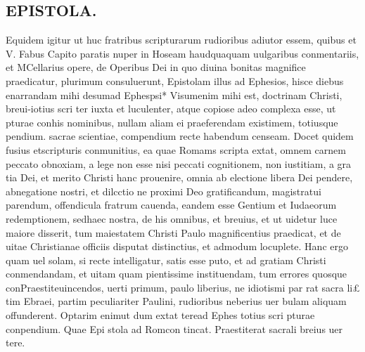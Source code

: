 \documentclass{article}
\begin{document}
\begin{pages}
\section*{EPISTOLA. }\pstart Equidem igitur ut huc fratribus scripturarum rudioribus   adiutor essem, quibus et V. Fabus  Capito paratis nuper in Hoseam haudquaquam uulgaribus conmentariis, et MCellarius opere, de Operibus Dei in quo diuina bonitas magnifice praedicatur, plurimum consuluerunt, Epistolam illus ad Ephesios, hisce diebus enarrandam mihi desumad Ephespsi* Visumenim mihi est, doctrinam Christi, breui-iotius scri ter iuxta et luculenter, atque copiose adeo complexa esse, ut pturae conhis nominibus, nullam aliam ei praeferendam existimem, totiusque pendium. sacrae scientiae, compendium recte habendum censeam.  \pend\pstart Docet quidem fusius etscripturis conmunitius, ea quae Romams scripta extat, omnem carnem peccato obnoxiam, a lege non esse nisi peccati cognitionem, non iustitiam, a gra tia Dei, et merito Christi hanc prouenire, omnia ab electione libera Dei pendere, abnegatione nostri, et dilcctio ne proximi Deo gratificandum, magistratui parendum, offendicula fratrum cauenda, eandem esse Gentium et Iudaeorum redemptionem, sedhaec nostra, de his omnibus, et breuius, et ut uidetur luce maiore disserit, tum maiestatem Christi Paulo magnificentius praedicat, et de uitae Christianae officiis disputat distinctius, et admodum locuplete.  \pend\pstart Hanc ergo quam uel solam, si recte intelligatur, satis esse puto, et ad gratiam Christi conmendandam, et uitam quam pientissime instituendam, tum errores quosque conPraestiteuincendos, uerti primum, paulo liberius, ne idiotismi par rat sacra li£ tim Ebraei, partim peculiariter Paulini, rudioribus neberius uer bulam aliquam offunderent. Optarim enimut dum extat tere\pendEpistola ad Ephes totius scri pturae conpendium.  Quae Epi stola ad Romcon tincat. Praestiterat sacrali breius uer tere.  

\end{pages}
\end{document}
